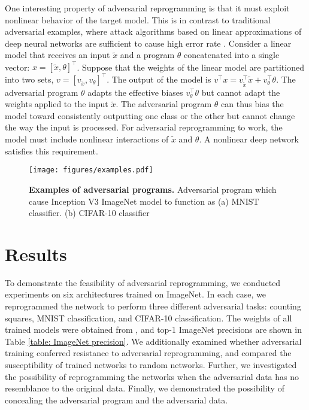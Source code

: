 \documentclass{article}
\begin{document}
One interesting property of adversarial reprogramming is that it must
exploit nonlinear behavior of the target model.
This is in contrast to traditional adversarial examples, where attack
algorithms based on linear approximations of deep neural networks are
sufficient to cause high error rate \citep{goodfellow2014explaining}.
Consider a linear model that receives an input $\tilde{x}$ and a program
$\theta$ concatenated into a single vector: $x = [\tilde{x}, \theta]^{\top}$.
Suppose that the weights of the linear model are partitioned into two
sets, $v = [v_{\tilde{x}}, v_\theta]^{\top}$.
The output of the model is $v^{\top} x = v_{\tilde{x}}^{\top} \tilde{x} + v_\theta^{\top} \theta$.
The adversarial program $\theta$ adapts the effective biases
$v_\theta^{\top} \theta$ but cannot adapt the weights applied to the input $\tilde{x}$.
The adversarial program $\theta$ can thus bias the model toward consistently outputting one class or
the other but cannot change the way the input is processed.
For adversarial reprogramming to work, the model must include nonlinear interactions of $\tilde{x}$ and $\theta$.
A nonlinear deep network satisfies this requirement.



\begin{figure}
\centering
\texttt{[image: figures/examples.pdf]}
\caption{{\bf Examples of adversarial programs.}
Adversarial program which cause Inception V3 ImageNet model to function as (a) MNIST classifier. (b) CIFAR-10 classifier}
\label{fig: ex}
\end{figure}\section{Results}\label{sec results}
To demonstrate the feasibility of adversarial reprogramming, 
we conducted experiments on six architectures trained on ImageNet. 
In each case, we reprogrammed the network to perform three different adversarial tasks: counting squares, MNIST classification, and CIFAR-10 classification. 
The weights of all trained models were obtained from \citet{tfslim}, and top-1 ImageNet precisions are shown in Table \ref{table: ImageNet precision}. 
We additionally examined whether adversarial training conferred resistance to adversarial reprogramming, and compared the susceptibility of trained networks to random networks. Further, we investigated the possibility of reprogramming the networks when the adversarial data has no resemblance to the original data. Finally, we demonstrated the possibility of concealing the adversarial program and the adversarial data.
\end{document}
